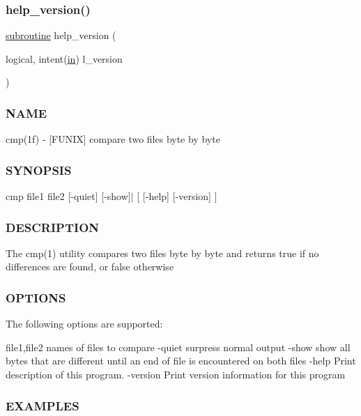 \subsubsection{\texorpdfstring{help\+\_\+version()}{help\_version()}}
{\footnotesize\ttfamily \hyperlink{M__stopwatch_83_8txt_acfbcff50169d691ff02d4a123ed70482}{subroutine} help\+\_\+version (\begin{DoxyParamCaption}\item[{logical, intent(\hyperlink{M__journal_83_8txt_afce72651d1eed785a2132bee863b2f38}{in})}]{l\+\_\+version }\end{DoxyParamCaption})}



\subsubsection*{N\+A\+ME}

cmp(1f) -\/ \mbox{[}F\+U\+N\+IX\mbox{]} compare two files byte by byte \subsubsection*{S\+Y\+N\+O\+P\+S\+IS}

cmp file1 file2 \mbox{[}-\/quiet\mbox{]} \mbox{[}-\/show\mbox{]}$\vert$ \mbox{[} \mbox{[}-\/help\mbox{]} \mbox{[}-\/version\mbox{]} \mbox{]} \subsubsection*{D\+E\+S\+C\+R\+I\+P\+T\+I\+ON}

The cmp(1) utility compares two files byte by byte and returns true if no differences are found, or false otherwise \subsubsection*{O\+P\+T\+I\+O\+NS}

The following options are supported\+:

file1,file2 names of files to compare -\/quiet surpress normal output -\/show show all bytes that are different until an end of file is encountered on both files -\/help Print description of this program. -\/version Print version information for this program

\subsubsection*{E\+X\+A\+M\+P\+L\+ES}

